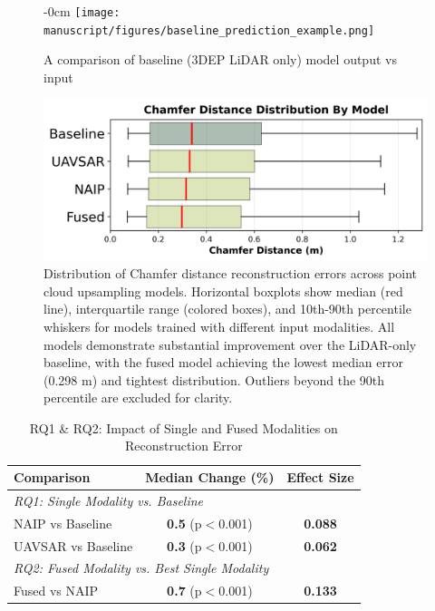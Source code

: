 \documentclass[remotesensing,article,submit,pdftex,moreauthors]{Definitions/mdpi}
\newenvironment{widefigure}[1][]{%
  \begin{figure}[#1]\begin{adjustwidth}{-\extralength}{0cm}\centering}{%
  \end{adjustwidth}\end{figure}}
\begin{document}
\begin{widefigure}[!t]
    \vspace{-15pt}  
    \centering
    \texttt{[image: manuscript/figures/baseline\_prediction\_example.png]}
    \caption{A comparison of baseline (3DEP LiDAR only) model output vs input}
    \label{fig:baseline_pt_cloud_example}
\end{widefigure}

\begin{figure}
    \centering
    \includegraphics[width=0.75\linewidth]{manuscript/figures/boxplot_by_model.png}
    \caption{Distribution of Chamfer distance reconstruction errors across point cloud upsampling models. Horizontal boxplots show median (red line), interquartile range (colored boxes), and 10th-90th percentile whiskers for models trained with different input modalities. All models demonstrate substantial improvement over the LiDAR-only baseline, with the fused model achieving the lowest median error (0.298 m) and tightest distribution. Outliers beyond the 90th percentile are excluded for clarity.}
    \label{fig:boxplot_model_comparison}
\end{figure}





\begin{table}[htbp]
\centering
\caption{RQ1 \& RQ2: Impact of Single and Fused Modalities on Reconstruction Error}
\label{tab:rq1_rq2_combined}
\begin{tabular}{lcc}
\toprule
\textbf{Comparison} & \textbf{Median Change (\%)} & \textbf{Effect Size} \\
\midrule
\multicolumn{3}{l}{\textit{RQ1: Single Modality vs. Baseline}} \\
\quad NAIP vs Baseline & \textbf{0.5} (p$<$0.001) & \textbf{0.088} \\
\quad UAVSAR vs Baseline & \textbf{0.3} (p$<$0.001) & \textbf{0.062} \\
\midrule
\multicolumn{3}{l}{\textit{RQ2: Fused Modality vs. Best Single Modality}} \\
\quad Fused vs NAIP & \textbf{0.7} (p$<$0.001) & \textbf{0.133} \\
\bottomrule
\end{tabular}
\end{table}
\end{document}
